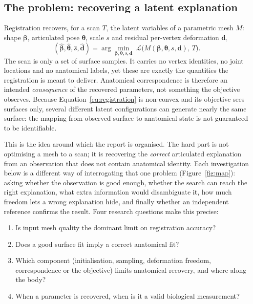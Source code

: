\subsection{The problem: recovering a latent explanation}
\label{sec:problem}

Registration recovers, for a scan $T$, the latent variables of a parametric
mesh $M$: shape $\bm\beta$, articulated pose $\bm\theta$, scale $s$ and
residual per-vertex deformation $\mathbf d$,
\begin{equation}
(\hat{\bm\beta},\hat{\bm\theta},\hat s,\hat{\mathbf d})
 =\arg\min_{\bm\beta,\bm\theta,s,\mathbf d}\;
 \mathcal{L}\big(M(\bm\beta,\bm\theta,s,\mathbf d),\,T\big).
\label{eq:registration}
\end{equation}
The scan is only a set of surface samples. It carries no vertex identities, no
joint locations and no anatomical labels, yet these are exactly the quantities
the registration is meant to deliver. Anatomical correspondence is therefore an
intended \emph{consequence} of the recovered parameters, not something the
objective observes. Because Equation~\eqref{eq:registration} is non-convex and
its objective sees surfaces only, several different latent configurations can
generate nearly the same surface: the mapping from observed surface to
anatomical state is not guaranteed to be identifiable.

This is the idea around which the report is organised. The hard part is not
optimising a mesh to a scan; it is recovering the \emph{correct} articulated
explanation from an observation that does not contain anatomical identity. Each
investigation below is a different way of interrogating that one problem
(Figure~\ref{fig:map}): asking whether the observation is good enough, whether
the search can reach the right explanation, what extra information would
disambiguate it, how much freedom lets a wrong explanation hide, and finally
whether an independent reference confirms the result. Four research questions
make this precise:
\begin{enumerate}[label=\textbf{RQ\arabic*.}]
\item Is input mesh quality the dominant limit on registration accuracy?
\item Does a good surface fit imply a correct anatomical fit?
\item Which component (initialisation, sampling, deformation freedom,
correspondence or the objective) limits anatomical recovery, and where along
the body?
\item When a parameter is recovered, when is it a valid biological
measurement?
\end{enumerate}

